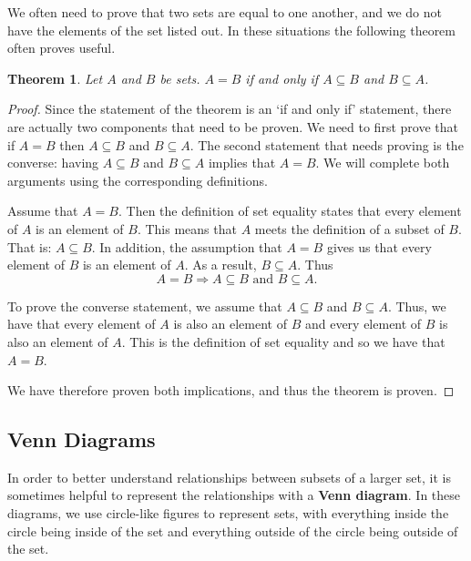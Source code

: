 \documentclass[
]{book}
\newtheorem{theorem}{Theorem}[chapter]
\theoremstyle{definition}
\theoremstyle{definition}
\theoremstyle{definition}
\theoremstyle{remark}
\begin{document}
We often need to prove that two sets are equal to one another, and we do not have the elements of the set listed out. In these situations the following theorem often proves useful.

\begin{theorem}
\protect\hypertarget{thm:set-equality}{}{\label{thm:set-equality} }Let \(A\) and \(B\) be sets. \(A=B\) if and only if \(A \subseteq B\) and \(B \subseteq A\).
\end{theorem}

\begin{proof}
{}Since the statement of the theorem is an `if and only if' statement, there are actually two components that need to be proven. We need to first prove that if \(A=B\) then \(A \subseteq B\) and \(B \subseteq A\). The second statement that needs proving is the converse: having \(A \subseteq B\) and \(B \subseteq A\) implies that \(A=B\). We will complete both arguments using the corresponding definitions.

Assume that \(A=B\). Then the definition of set equality states that every element of \(A\) is an element of \(B\). This means that \(A\) meets the definition of a subset of \(B\). That is: \(A\subseteq B\). In addition, the assumption that \(A=B\) gives us that every element of \(B\) is an element of \(A\). As a result, \(B\subseteq A\). Thus \[A=B \Rightarrow A\subseteq B \mbox{ and } B\subseteq A.\]

To prove the converse statement, we assume that \(A \subseteq B\) and \(B \subseteq A\). Thus, we have that every element of \(A\) is also an element of \(B\) and every element of \(B\) is also an element of \(A\). This is the definition of set equality and so we have that \(A=B\).

We have therefore proven both implications, and thus the theorem is proven.
\end{proof}

\hypertarget{venn-diagrams}{%
\subsection{Venn Diagrams}\label{venn-diagrams}}

In order to better understand relationships between subsets of a larger set, it is sometimes helpful to represent the relationships with a \textbf{Venn diagram}. In these diagrams, we use circle-like figures to represent sets, with everything inside the circle being inside of the set and everything outside of the circle being outside of the set.
\end{document}
